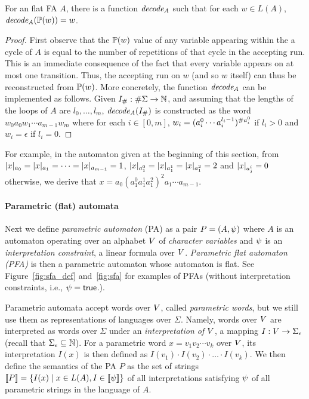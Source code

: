 \documentclass[sigplan,review,anonymous]{acmart}\settopmatter{printfolios=true,printccs=false,printacmref=false}
\begin{document}
\begin{lemma}\label{lemma:decoding}
For an flat FA $A$, there is a function $\mathit{decode_{A}}$ such that for each $w\in L(A)$, $\mathit{decode_{A}}(\mathbb{P}{(w)}) = w$. 
\end{lemma}
%
\begin{proof}
First observe that the $\mathbb{P}{(w)}$ value of any variable appearing within the a cycle of $A$ is equal to the number of repetitions of that cycle in the accepting run. This is an immediate consequence of the fact that 
 every variable appears on at most one transition. Thus, the accepting run on $w$ (and so $w$ itself) can thus be reconstructed from $\mathbb{P}{(w)}$.  More concretely, the function $\mathit{decode_{A}}$ can be implemented as follows. 
Given $I_{\#}:\#\Sigma\rightarrow\mathbb{N}$,
and assuming that the lengths of the loops of $A$ are $l_0,\ldots,l_{m}$, 
$\mathit{decode_{A}}(I_{\#})$ is constructed as the word $w_0 a_{0} w_1 \cdots a_{m-1} w_{m}$ where for each $i\in [0,m]$,
$w_i = (a_i^0 \cdots a_i^{l_{i}-1})^{\#{a_i^0}}$ if $l_i >0$ and $w_i = \epsilon$ if $l_i = 0$. 
\end{proof}
%
For example, in the automaton given at the beginning of this section, 
from $|x|_{a_0} = |x|_{a_1} = \cdots = |x|_{a_{m-1}}=1$, $|x|_{a^0_1}=|x|_{a^1_1}=|x|_{a^2_1}=2$ and $|x|_{a^i_j}=0$ otherwise,  we derive that $x=a_0(a^0_1a^1_1a^2_1)^2a_1\cdots a_{m-1}$. 

\paragraph{Parametric (flat) automata}
Next we define \emph{parametric automaton} (PA) as a pair  $P = (A,\psi)$ where 
$A$ is an automaton operating over an alphabet $V$ of \emph{character variables}  
and $\psi$ is an \emph{interpretation constraint}, a linear formula over $V$. 
\emph{Parametric flat automaton (PFA)} is then a parametric automaton whose  automaton is flat. See Figure~\ref{fig:sfa_def} and~\ref{fig:sfa} for examples of PFAs (without interpretation constraints, i.e., $\psi = \mbox{$\mathsf{true}$}$.).

Parametric automata accept words over $V$, called \emph{parametric words}, but we still use them as representations of languages over $\Sigma$. 
%
Namely, words over $V$ are interpreted as words over $\Sigma$ under an
\emph{interpretation of $V$},
%
a mapping $I:V\rightarrow\Sigma_\epsilon$ (recall that $\Sigma_\epsilon \subseteq \mathbb{N}$). 
For a parametric word $x= v_1v_2\cdots v_k$ over $V$, its interpretation $I(x)$ is then defined as $I(v_1)\cdot I(v_2)\cdot \ldots \cdot I(v_k)$.
%
We then define the semantics of the PA $P$ as the set of strings   
$[\![P]\!] = \{I(x) \mid x\in L(A),I\in[\![\psi]\!]\}$ of all interpretations satisfying $\psi$ of all parametric strings in the language of $A$. 
\end{document}
